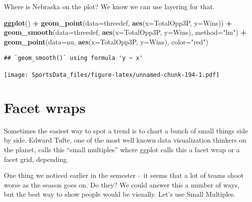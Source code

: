 \documentclass[
]{book}
\newenvironment{Shaded}{\begin{snugshade}}{\end{snugshade}}
\newcommand{\DataTypeTok}[1]{\textcolor[rgb]{0.13,0.29,0.53}{#1}}
\newcommand{\KeywordTok}[1]{\textcolor[rgb]{0.13,0.29,0.53}{\textbf{#1}}}
\newcommand{\NormalTok}[1]{#1}
\newcommand{\OperatorTok}[1]{\textcolor[rgb]{0.81,0.36,0.00}{\textbf{#1}}}
\newcommand{\StringTok}[1]{\textcolor[rgb]{0.31,0.60,0.02}{#1}}
\begin{document}
Where is Nebraska on the plot? We know we can use layering for that.

\begin{Shaded}
\end{Shaded}

\begin{Shaded}
\begin{Highlighting}[]
\KeywordTok{ggplot}\NormalTok{() }\OperatorTok{+}\StringTok{ }
\StringTok{  }\KeywordTok{geom_point}\NormalTok{(}\DataTypeTok{data=}\NormalTok{threedef, }\KeywordTok{aes}\NormalTok{(}\DataTypeTok{x=}\NormalTok{TotalOpp3P, }\DataTypeTok{y=}\NormalTok{Wins)) }\OperatorTok{+}
\StringTok{  }\KeywordTok{geom_smooth}\NormalTok{(}\DataTypeTok{data=}\NormalTok{threedef, }\KeywordTok{aes}\NormalTok{(}\DataTypeTok{x=}\NormalTok{TotalOpp3P, }\DataTypeTok{y=}\NormalTok{Wins), }\DataTypeTok{method=}\StringTok{"lm"}\NormalTok{) }\OperatorTok{+}
\StringTok{  }\KeywordTok{geom_point}\NormalTok{(}\DataTypeTok{data=}\NormalTok{nu, }\KeywordTok{aes}\NormalTok{(}\DataTypeTok{x=}\NormalTok{TotalOpp3P, }\DataTypeTok{y=}\NormalTok{Wins), }\DataTypeTok{color=}\StringTok{"red"}\NormalTok{)}
\end{Highlighting}
\end{Shaded}

\begin{verbatim}
## `geom_smooth()` using formula 'y ~ x'
\end{verbatim}

\texttt{[image: SportsData\_files/figure-latex/unnamed-chunk-194-1.pdf]}

\hypertarget{facet-wraps}{%
\chapter{Facet wraps}\label{facet-wraps}}

Sometimes the easiest way to spot a trend is to chart a bunch of small things side by side. Edward Tufte, one of the most well known data visualization thinkers on the planet, calls this ``small multiples'' where ggplot calls this a facet wrap or a facet grid, depending.

One thing we noticed earlier in the semester -- it seems that a lot of teams shoot worse as the season goes on. Do they? We could answer this a number of ways, but the best way to show people would be visually. Let's use Small Multiples.
\end{document}
